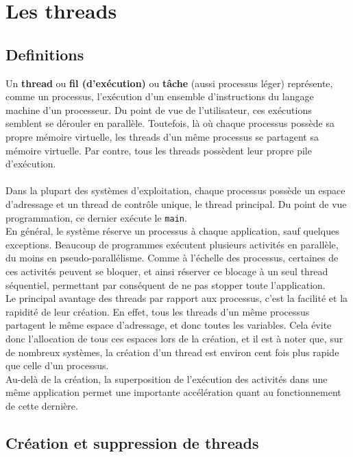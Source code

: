 \section{Les threads}

	\subsection{Definitions}
		Un \textbf{thread} ou \textbf{fil (d'exécution)} ou \textbf{tâche} (aussi processus léger) représente, comme un processus, l'exécution d'un ensemble d'instructions du langage machine d'un processeur. Du point de vue de l'utilisateur, ces exécutions semblent se dérouler en parallèle. Toutefois, là où chaque processus possède sa propre mémoire virtuelle, les threads d'un même processus se partagent sa mémoire virtuelle. Par contre, tous les threads possèdent leur propre pile d'exécution.
		
		\paragraph{} Dans la plupart des systèmes d'exploitation, chaque processus possède un espace d'adressage et un thread de contrôle unique, le thread principal. Du point de vue programmation, ce dernier exécute le \lstinline!main!.\\
		En général, le système réserve un processus à chaque application, sauf quelques exceptions. Beaucoup de programmes exécutent plusieurs activités en parallèle, du moins en pseudo-parallélisme. Comme à l'échelle des processus, certaines de ces activités peuvent se bloquer, et ainsi réserver ce blocage à un seul thread séquentiel, permettant par conséquent de ne pas stopper toute l'application.\\
		Le principal avantage des threads par rapport aux processus, c'est la facilité et la rapidité de leur création. En effet, tous les threads d'un même processus partagent le même espace d'adressage, et donc toutes les variables. Cela évite donc l'allocation de tous ces espaces lors de la création, et il est à noter que, sur de nombreux systèmes, la création d'un thread est environ cent fois plus rapide que celle d'un processus.\\
		Au-delà de la création, la superposition de l'exécution des activités dans une même application permet une importante accélération quant au fonctionnement de cette dernière.
		
	\subsection{Création et suppression de threads}
	
